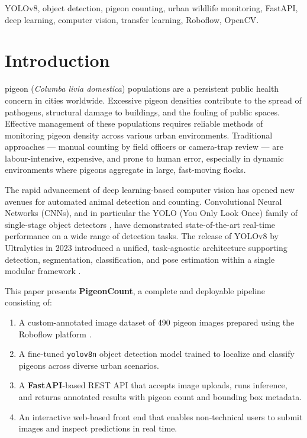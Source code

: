 \documentclass[journal]{IEEEtran}
\begin{document}
\begin{IEEEkeywords}
YOLOv8, object detection, pigeon counting, urban wildlife monitoring, FastAPI, deep learning, computer vision, transfer learning, Roboflow, OpenCV.
\end{IEEEkeywords}

\section{Introduction}

 pigeon (\textit{Columba livia domestica}) populations are a persistent public health concern in cities worldwide. Excessive pigeon densities contribute to the spread of pathogens, structural damage to buildings, and the fouling of public spaces. Effective management of these populations requires reliable methods of monitoring pigeon density across various urban environments. Traditional approaches --- manual counting by field officers or camera-trap review --- are labour-intensive, expensive, and prone to human error, especially in dynamic environments where pigeons aggregate in large, fast-moving flocks.

The rapid advancement of deep learning-based computer vision has opened new avenues for automated animal detection and counting. Convolutional Neural Networks (CNNs), and in particular the YOLO (You Only Look Once) family of single-stage object detectors \cite{yolov8_ultralytics, redmon2016yolo}, have demonstrated state-of-the-art real-time performance on a wide range of detection tasks. The release of YOLOv8 by Ultralytics in 2023 introduced a unified, task-agnostic architecture supporting detection, segmentation, classification, and pose estimation within a single modular framework \cite{yolov8_ultralytics}.

This paper presents \textbf{PigeonCount}, a complete and deployable pipeline consisting of:
\begin{enumerate}
  \item A custom-annotated image dataset of 490 pigeon images prepared using the Roboflow platform \cite{roboflow}.
  \item A fine-tuned \texttt{yolov8n} object detection model trained to localize and classify pigeons across diverse urban scenarios.
  \item A \textbf{FastAPI}-based REST API that accepts image uploads, runs inference, and returns annotated results with pigeon count and bounding box metadata.
  \item An interactive web-based front end that enables non-technical users to submit images and inspect predictions in real time.
\end{enumerate}
\end{document}
